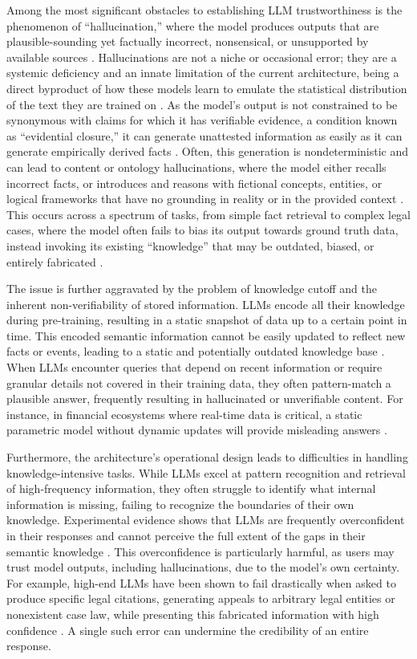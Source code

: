 \documentclass[11pt]{article}
\begin{document}
Among the most significant obstacles to establishing LLM trustworthiness is the phenomenon of ``hallucination,'' where the model produces outputs that are plausible-sounding yet factually incorrect, nonsensical, or unsupported by available sources \cite{ref6,ref7}. Hallucinations are not a niche or occasional error; they are a systemic deficiency and an innate limitation of the current architecture, being a direct byproduct of how these models learn to emulate the statistical distribution of the text they are trained on \cite{ref6}. As the model's output is not constrained to be synonymous with claims for which it has verifiable evidence, a condition known as ``evidential closure,'' it can generate unattested information as easily as it can generate empirically derived facts \cite{ref8}. Often, this generation is nondeterministic and can lead to content or ontology hallucinations, where the model either recalls incorrect facts, or introduces and reasons with fictional concepts, entities, or logical frameworks that have no grounding in reality or in the provided context \cite{ref2}. This occurs across a spectrum of tasks, from simple fact retrieval to complex legal cases, where the model often fails to bias its output towards ground truth data, instead invoking its existing ``knowledge'' that may be outdated, biased, or entirely fabricated \cite{ref9,ref10}.

The issue is further aggravated by the problem of knowledge cutoff and the inherent non-verifiability of stored information. LLMs encode all their knowledge during pre-training, resulting in a static snapshot of data up to a certain point in time. This encoded semantic information cannot be easily updated to reflect new facts or events, leading to a static and potentially outdated knowledge base \cite{ref11}. When LLMs encounter queries that depend on recent information or require granular details not covered in their training data, they often pattern-match a plausible answer, frequently resulting in hallucinated or unverifiable content. For instance, in financial ecosystems where real-time data is critical, a static parametric model without dynamic updates will provide misleading answers \cite{ref12}.

Furthermore, the architecture's operational design leads to difficulties in handling knowledge-intensive tasks. While LLMs excel at pattern recognition and retrieval of high-frequency information, they often struggle to identify what internal information is missing, failing to recognize the boundaries of their own knowledge. Experimental evidence shows that LLMs are frequently overconfident in their responses and cannot perceive the full extent of the gaps in their semantic knowledge \cite{ref13,ref14}. This overconfidence is particularly harmful, as users may trust model outputs, including hallucinations, due to the model's own certainty. For example, high-end LLMs have been shown to fail drastically when asked to produce specific legal citations, generating appeals to arbitrary legal entities or nonexistent case law, while presenting this fabricated information with high confidence \cite{ref10,ref15}. A single such error can undermine the credibility of an entire response.
\end{document}
